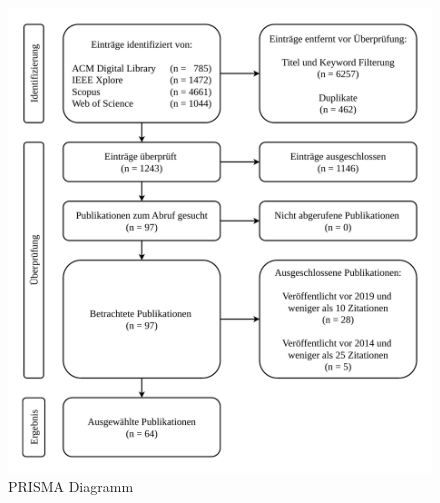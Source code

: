 \begin{figure}[htbp]
    \centering
    \includegraphics[width=\textwidth]{diagrams/PRISMA.pdf}
    \caption{PRISMA Diagramm}
    \label{figure:stand-der-technik:literaturrecherche:prisma-diagram}
\end{figure}





